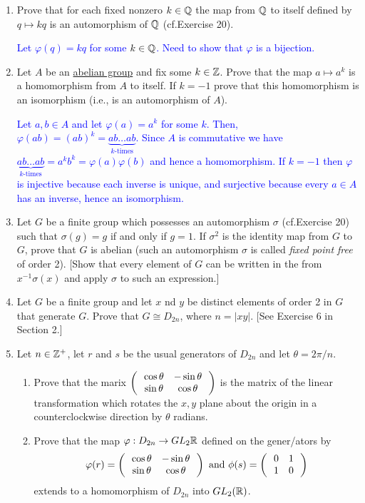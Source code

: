 \documentclass[10pt,a4paper]{report}
\newcommand{\BLUE}[1]{\textcolor{blue}{#1}}
\begin{document}
\begin{enumerate}
	\item Prove that for each fixed nonzero $k \in \mathbb{Q}$ the map from $\mathbb{Q}$ to itself defined by $q \mapsto kq$ is an automorphism of $\mathbb{Q}$ (cf.Exercise 20).
	
	\BLUE{Let $\varphi(q)=kq$ for some $k\in \mathbb{Q}$.  Need to show that $\varphi$ is a bijection.
	}
	
	\item Let $A$ be an \underline{abelian group} and fix some $k \in \mathbb{Z}$.  Prove that the map $a \mapsto a^k$ is a homomorphism from $A$ to itself.  If $k = -1$  prove that this homomorphism is an isomorphism (i.e., is an automorphism of $A$).
	
	\BLUE{Let $a,b \in A$ and let $\varphi(a) = a^k$ for some $k$.  Then, $\varphi(ab)= (ab)^k= \underbrace{ab\dots ab}_{k\text{-times}}$.  Since $A$ is commutative we have $\underbrace{ab\dots ab}_{k\text{-times}}=a^kb^k=\varphi(a)\varphi(b)$ and hence a homomorphism.  If $k=-1$ then $\varphi$ is injective because each inverse is unique, and surjective because every $a \in A$ has an inverse, hence an isomorphism.
	}
	
	\item Let $G$ be a finite group which possesses an automorphism $\sigma$ (cf.Exercise 20) such that $\sigma(g)=g$ if and only if $g=1$.  If $\sigma^2$ is the identity map from $G$ to $G$, prove that $G$ is abelian (such an automorphism $\sigma$ is called \textit{fixed point free} of order 2).  [Show that every element of $G$ can be written in the from $x^{-1}\sigma(x)$ and apply $\sigma$ to such an expression.]
	
	\item Let $G$ be a finite group and let $x$ nd $y$ be distinct elements of order 2 in $G$ that generate $G$.  Prove that $G\cong D_{2n}$, where $n =|xy|$. [See Exercise 6 in Section 2.]
	
	\item Let $n \in \mathbb{Z}^+$, let $r$ and $s$ be the usual generators of $D_{2n}$ and let $\theta=2\pi/n$.
	\begin{enumerate}
		\item Prove that the marix $\left (\,  \begin{array}{c c} \cos \theta&-\sin\theta \\ \sin\theta & \cos\theta \end{array}  \,\right )$ is the matrix of the linear transformation which rotates the $x,y$ plane about the origin in a counterclockwise direction by $\theta$ radians.
		
		\item Prove that the map $\varphi : D_{2n}\to GL_2{\mathbb{R}}$ defined on the gener/ators by 
		\begin{align*}
			\varphi(r)=\left (\,  \begin{array}{c c} \cos \theta&-\sin\theta \\ \sin\theta & \cos\theta \end{array}  \,\right ) \text{ and } \phi(s)=\left (\,  \begin{array}{c c} 0&1 \\ 1 & 0 \end{array}  \,\right )
		\end{align*}extends to a homomorphism of $D_{2n}$ into $GL_2(\mathbb{R})$.
		

\end{enumerate}
\end{enumerate}
\end{document}
